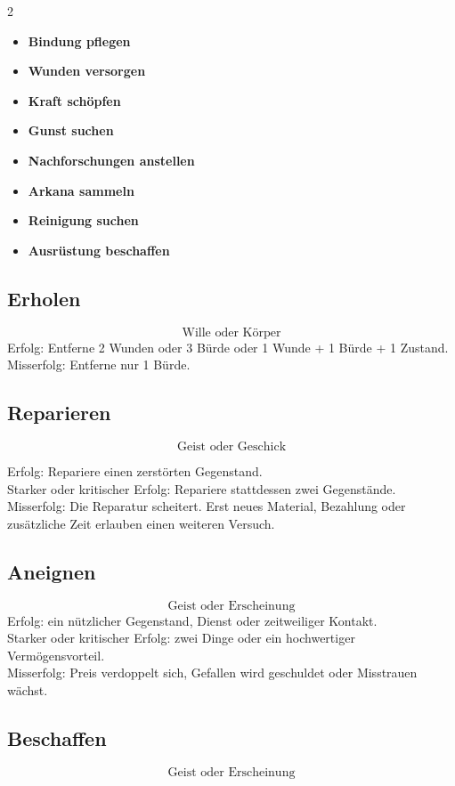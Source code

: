 \begin{multicols*}{2}
\begin{itemize}[leftmargin=*]
\item \textbf{Bindung pflegen}
\item \textbf{Wunden versorgen}
\item \textbf{Kraft schöpfen}
\item \textbf{Gunst suchen}
\item \textbf{Nachforschungen anstellen}
\item \textbf{Arkana sammeln}
\item \textbf{Reinigung suchen}
\item \textbf{Ausrüstung beschaffen}
\end{itemize}

\subsection{Erholen}
\[
\text{Wille oder Körper}
\]
Erfolg: Entferne 2 Wunden oder 3 Bürde oder 1 Wunde + 1 Bürde + 1 Zustand.\\
Misserfolg: Entferne nur 1 Bürde.

\subsection{Reparieren}
\[
\text{Geist oder Geschick}
\]

Erfolg: Repariere einen zerstörten Gegenstand.\\
Starker oder kritischer Erfolg: Repariere stattdessen zwei Gegenstände.\\
Misserfolg: Die Reparatur scheitert. Erst neues Material, Bezahlung oder zusätzliche Zeit erlauben einen weiteren Versuch.

\subsection{Aneignen}
\[
\text{Geist oder Erscheinung}
\]
Erfolg: ein nützlicher Gegenstand, Dienst oder zeitweiliger Kontakt.\\
Starker oder kritischer Erfolg: zwei Dinge oder ein hochwertiger Vermögensvorteil.\\
Misserfolg: Preis verdoppelt sich, Gefallen wird geschuldet oder Misstrauen wächst.

\subsection{Beschaffen}
\[
\text{Geist oder Erscheinung}
\]


\end{multicols*}
